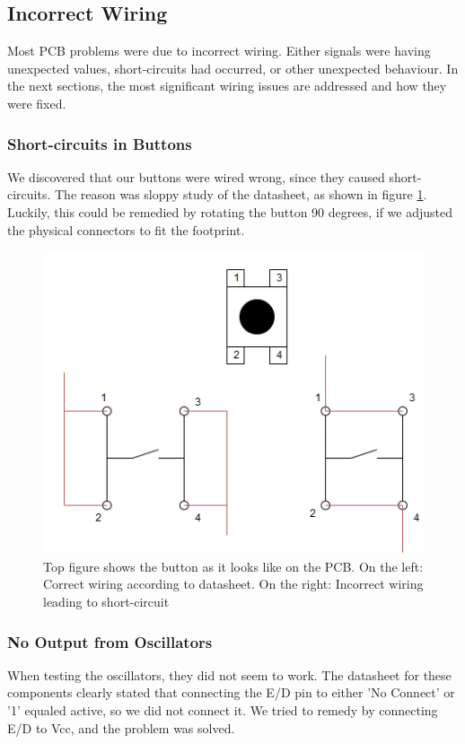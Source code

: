 \subsection{Incorrect Wiring}
Most PCB problems were due to incorrect wiring. Either signals were having unexpected values, short-circuits had occurred, or other unexpected behaviour. In the next sections, the most significant wiring issues are addressed and how they were fixed.

\subsubsection{Short-circuits in Buttons}
We discovered that our buttons were wired wrong, since they caused short-circuits. The reason was sloppy study of the datasheet, as shown in figure \ref{fig:Button Issue}. Luckily, this could be remedied by rotating the button 90 degrees, if we adjusted the physical connectors to fit the footprint.

\begin{figure}[h!]
\centering
\includegraphics[scale=0.5]{images/Button_Issue.png}
\caption{Top figure shows the button as it looks like on the PCB. On the left: Correct wiring according to datasheet. On the right: Incorrect wiring leading to short-circuit}
\label{fig:Button Issue}
\end{figure}

\subsubsection{No Output from Oscillators}
When testing the oscillators, they did not seem to work. The datasheet for these components clearly stated that connecting the E/D pin to either 'No Connect' or '1' equaled active, so we did not connect it. We tried to remedy by connecting E/D to Vcc, and the problem was solved.


